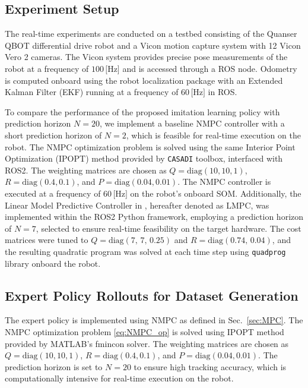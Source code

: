 \documentclass[letterpaper, 10 pt, conference]{ieeeconf}
\begin{document}
\subsection{Experiment  Setup}
The real-time experiments are conducted on a testbed consisting of the Quanser QBOT differential drive robot and a Vicon motion capture system with 12 Vicon Vero 2 cameras. The Vicon system provides precise pose measurements of the robot at a frequency of $100\,\text{[Hz]}$ and is accessed through a ROS node. Odometry is computed onboard using the robot localization package\cite{robotlocalization} with an Extended Kalman Filter (EKF) running at a frequency of $60\,\text{[Hz]}$ in ROS.

To compare the performance of the proposed imitation learning policy with prediction horizon $N=20$, we implement a baseline NMPC controller with a short prediction horizon of $N=2$, which is feasible for real-time execution on the robot. The NMPC optimization problem is solved using the same Interior Point Optimization (IPOPT) method provided by \texttt{CASADI} toolbox, interfaced with ROS2. The weighting matrices are chosen as $Q = \text{diag}(10, 10, 1)$, $R = \text{diag}(0.4, 0.1)$, and $P = \text{diag}(0.04, 0.01)$. The NMPC controller is executed at a frequency of $60\,\text{[Hz]}$ on the robot's onboard SOM.
Additionally, the Linear Model Predictive Controller in \cite{KLANCAR2007460}, hereafter denoted as LMPC, was implemented within the ROS2 Python framework, employing a prediction horizon of $N=7$,  selected to ensure real-time feasibility on the target hardware. The cost matrices were tuned to $Q = \text{diag}(7,\, 7,\, 0.25)$ and $R = \text{diag}(0.74,\, 0.04)$, and the resulting quadratic program was solved at each time step using \texttt{quadprog} library onboard the robot.

\subsection{Expert Policy Rollouts for Dataset Generation}

The expert policy is implemented using NMPC as defined in Sec.~\ref{sec:MPC}. The NMPC optimization problem \eqref{eq:NMPC_op} is solved using IPOPT method provided by MATLAB's fmincon solver. The weighting matrices are chosen as $Q = \text{diag}(10, 10, 1)$, $R = \text{diag}(0.4, 0.1)$, and $P = \text{diag}(0.04, 0.01)$. The prediction horizon is set to $N=20$ to ensure high tracking accuracy, which is computationally intensive for real-time execution on the robot.
\end{document}
